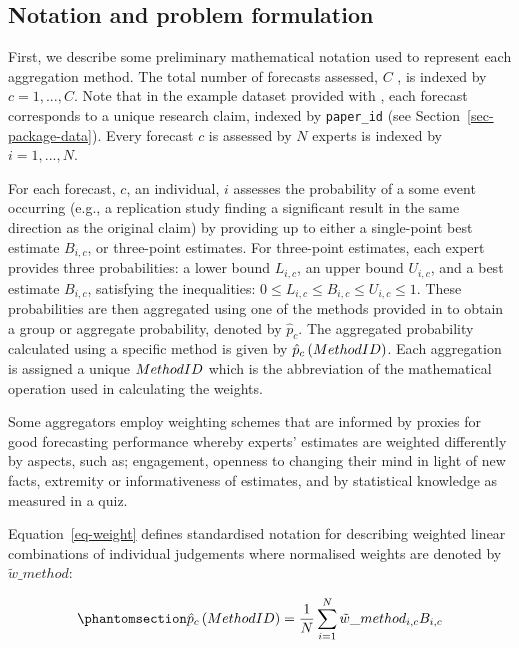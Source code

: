 \documentclass[
  11pt,
  a4paper,
]{article}
\begin{document}
\subsection{Notation and problem
formulation}\label{notation-and-problem-formulation}

First, we describe some preliminary mathematical notation used to
represent each aggregation method. The total number of forecasts
assessed, \(C\) , is indexed by \(c = 1, ..., C\). Note that in the
example dataset provided with , each forecast corresponds
to a unique research claim, indexed by \texttt{paper\_id} (see
Section~\ref{sec-package-data}). Every forecast \(c\) is assessed by
\(N\) experts is indexed by \(i = 1, ..., N\).

For each forecast, \(c\), an individual, \(i\) assesses the probability
of a some event occurring (e.g., a replication study finding a
significant result in the same direction as the original claim) by
providing up to either a single-point best estimate \(B_{i,c}\), or
three-point estimates. For three-point estimates, each expert provides
three probabilities: a lower bound \({L}_{i,c}\), an upper bound
\({U}_{i,c}\), and a best estimate \(B_{i,c}\), satisfying the
inequalities: \(0 \le L_{i,c} \le B_{i,c} \le U_{i,c} \le 1\). These
probabilities are then aggregated using one of the methods provided in
 to obtain a group or aggregate probability, denoted by
\(\hat{p}_c\). The aggregated probability calculated using a specific
method is given by \(\hat{p}_{c}\left(Method \space ID \right)\). Each
aggregation is assigned a unique \(Method \space ID\) which is the
abbreviation of the mathematical operation used in calculating the
weights.

Some aggregators employ weighting schemes that are informed by proxies
for good forecasting performance whereby experts' estimates are weighted
differently by aspects, such as; engagement, openness to changing their
mind in light of new facts, extremity or informativeness of estimates,
and by statistical knowledge as measured in a quiz.

Equation~\ref{eq-weight} defines standardised notation for describing
weighted linear combinations of individual judgements where normalised
weights are denoted by \(\tilde{w} \_ method\):

\begin{equation}\protect\phantomsection\label{eq-weight}{
\hat{p}_c\left(Method \space ID \right) = \frac{1}{N}\sum_{i=1}^N \tilde{w}\_{method}_{i,c}  B_{i,c}
}\end{equation}
\end{document}
